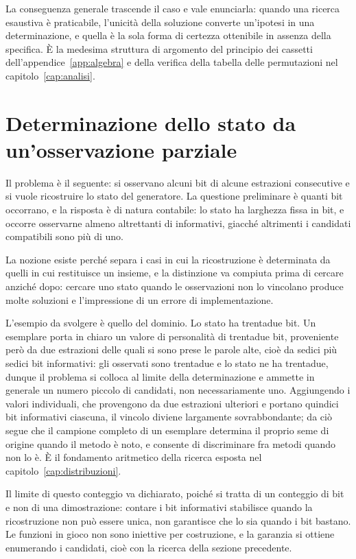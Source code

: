La conseguenza generale trascende il caso e vale enunciarla: quando una ricerca esaustiva è praticabile, l'unicità della soluzione converte un'ipotesi in una determinazione, e quella è la sola forma di certezza ottenibile in assenza della specifica. È la medesima struttura di argomento del principio dei cassetti dell'appendice~\ref{app:algebra} e della verifica della tabella delle permutazioni nel capitolo~\ref{cap:analisi}.

\section{Determinazione dello stato da un'osservazione parziale}

Il problema è il seguente: si osservano alcuni bit di alcune estrazioni consecutive e si vuole ricostruire lo stato del generatore. La questione preliminare è quanti bit occorrano, e la risposta è di natura contabile: lo stato ha larghezza fissa in bit, e occorre osservarne almeno altrettanti di informativi, giacché altrimenti i candidati compatibili sono più di uno.

La nozione esiste perché separa i casi in cui la ricostruzione è determinata da quelli in cui restituisce un insieme, e la distinzione va compiuta prima di cercare anziché dopo: cercare uno stato quando le osservazioni non lo vincolano produce molte soluzioni e l'impressione di un errore di implementazione.

L'esempio da svolgere è quello del dominio. Lo stato ha trentadue bit. Un esemplare porta in chiaro un valore di personalità di trentadue bit, proveniente però da due estrazioni delle quali si sono prese le parole alte, cioè da sedici più sedici bit informativi: gli osservati sono trentadue e lo stato ne ha trentadue, dunque il problema si colloca al limite della determinazione e ammette in generale un numero piccolo di candidati, non necessariamente uno. Aggiungendo i valori individuali, che provengono da due estrazioni ulteriori e portano quindici bit informativi ciascuna, il vincolo diviene largamente sovrabbondante; da ciò segue che il campione completo di un esemplare determina il proprio seme di origine quando il metodo è noto, e consente di discriminare fra metodi quando non lo è. È il fondamento aritmetico della ricerca esposta nel capitolo~\ref{cap:distribuzioni}.

Il limite di questo conteggio va dichiarato, poiché si tratta di un conteggio di bit e non di una dimostrazione: contare i bit informativi stabilisce quando la ricostruzione non può essere unica, non garantisce che lo sia quando i bit bastano. Le funzioni in gioco non sono iniettive per costruzione, e la garanzia si ottiene enumerando i candidati, cioè con la ricerca della sezione precedente.

